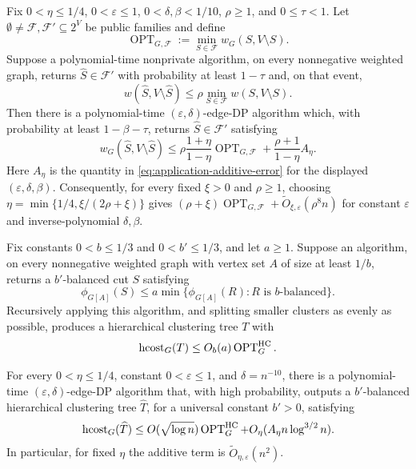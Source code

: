 \begin{theorem}
\label{thm:private-constrained-cut}
Fix $0<\eta\leq1/4$, $0<\varepsilon\leq1$, $0<\delta,\beta<1/10$,
$\rho\geq1$, and $0\leq\tau<1$.  Let
$\emptyset\ne\mathcal F,\mathcal F'\subseteq2^V$ be public families and
define
\[
 \operatorname{OPT}_{G,\mathcal F}
 :=\min_{S\in\mathcal F}w_G(S,V\setminus S).
\]
Suppose a polynomial-time nonprivate algorithm, on every nonnegative weighted graph, returns
$\widehat S\in\mathcal F'$ with probability at least $1-\tau$ and, on that event,
\[
 w(\widehat S,V\setminus\widehat S)
 \leq \rho\min_{S\in\mathcal F}w(S,V\setminus S).
\]
Then there is a polynomial-time $(\varepsilon, \delta)$-edge-DP algorithm which, with probability
at least $1-\beta-\tau$, returns $\widehat S\in\mathcal F'$ satisfying
\[
 w_G(\widehat S,V\setminus\widehat S)
 \leq \rho\frac{1+\eta}{1-\eta}\operatorname{OPT}_{G,\mathcal F}
   +\frac{\rho+1}{1-\eta}A_\eta.
\]
Here $A_\eta$ is the quantity in \eqref{eq:application-additive-error} for the displayed
$(\varepsilon, \delta,\beta)$.
Consequently, for every fixed $\xi>0$ and $\rho\geq1$, choosing
$\eta=\min\{1/4,\xi/(2\rho+\xi)\}$ gives
$(\rho+\xi)\operatorname{OPT}_{G,\mathcal F}
+\widetilde O_{\xi,\varepsilon}(\rho^{8}n)$ for constant $\varepsilon$ and
inverse-polynomial $\delta,\beta$.
\end{theorem}

\begin{lemma}\label{lem:hc-bicriteria-recursion}
Fix constants $0<b\leq1/3$ and $0<b'\leq1/3$, and let $a\geq1$.  Suppose an algorithm, on every
nonnegative weighted graph with vertex set $A$ of size at least $1/b$, returns a $b'$-balanced
cut $S$ satisfying
\[
 \phi_{G[A]}(S)\leq a\min\{\phi_{G[A]}(R):R\text{ is $b$-balanced}\}.
\]
Recursively applying this algorithm, and splitting smaller clusters as evenly as possible,
produces a hierarchical clustering tree $T$ with
\[
 \operatorname{hcost}_G(T)\leq O_b(a)\operatorname{OPT}^{\rm HC}_G.
\]
\end{lemma}

\begin{theorem}
\label{thm:private-hierarchical-clustering}
For every $0<\eta\leq1/4$, constant $0<\varepsilon\leq1$, and $\delta=n^{-10}$, there is a
polynomial-time $(\varepsilon, \delta)$-edge-DP algorithm that, with high probability, outputs a
$b'$-balanced hierarchical clustering tree $\widehat T$, for a universal constant $b'>0$,
satisfying
\[
 \operatorname{hcost}_G(\widehat T)
 \leq O(\sqrt{\log n})\operatorname{OPT}^{\rm HC}_G
  +O_\eta(A_\eta n\log^{3/2}n).
\]
In particular, for fixed $\eta$ the additive term is
$\widetilde O_{\eta,\varepsilon}(n^2)$.
\end{theorem}

